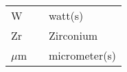 \begin{ThreePartTable}
\begin{longtable}{l l l}
        W                           &      \hspace{0.25in}     &         watt(s)                                            \\
        
        Zr                          &      \hspace{0.25in}     &         Zirconium                                          \\
        
        $\mu$m                      &      \hspace{0.25in}     &         micrometer(s)                                      \\
    
    \end{longtable}
\end{ThreePartTable}